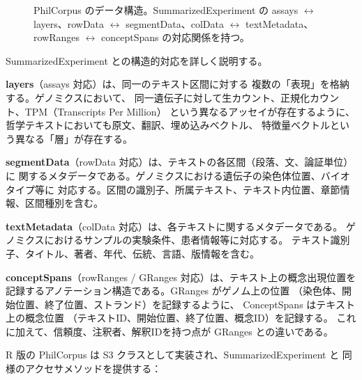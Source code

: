 \documentclass[a4paper,11pt]{ltjsarticle}
\begin{document}
\begin{figure}[H]
\caption{PhilCorpus のデータ構造。SummarizedExperiment の assays $\leftrightarrow$ layers、rowData $\leftrightarrow$ segmentData、colData $\leftrightarrow$ textMetadata、rowRanges $\leftrightarrow$ conceptSpans の対応関係を持つ。}
\label{fig:philcorpus}
\end{figure}

SummarizedExperiment との構造的対応を詳しく説明する。

\textbf{layers}（assays 対応）は、同一のテキスト区間に対する
複数の「表現」を格納する。ゲノミクスにおいて、
同一遺伝子に対して生カウント、正規化カウント、TPM（Transcripts Per Million）
という異なるアッセイが存在するように、
哲学テキストにおいても原文、翻訳、埋め込みベクトル、
特徴量ベクトルという異なる「層」が存在する。

\textbf{segmentData}（rowData 対応）は、テキストの各区間（段落、文、論証単位）に
関するメタデータである。ゲノミクスにおける遺伝子の染色体位置、バイオタイプ等に
対応する。区間の識別子、所属テキスト、テキスト内位置、章節情報、区間種別を含む。

\textbf{textMetadata}（colData 対応）は、各テキストに関するメタデータである。
ゲノミクスにおけるサンプルの実験条件、患者情報等に対応する。
テキスト識別子、タイトル、著者、年代、伝統、言語、版情報を含む。

\textbf{conceptSpans}（rowRanges / GRanges 対応）は、テキスト上の概念出現位置を
記録するアノテーション構造である。GRanges がゲノム上の位置
（染色体、開始位置、終了位置、ストランド）を記録するように、
ConceptSpans はテキスト上の概念位置
（テキストID、開始位置、終了位置、概念ID）を記録する。
これに加えて、信頼度、注釈者、解釈IDを持つ点が GRanges との違いである。

R 版の PhilCorpus は S3 クラスとして実装され、SummarizedExperiment と
同様のアクセサメソッドを提供する：
\end{document}
